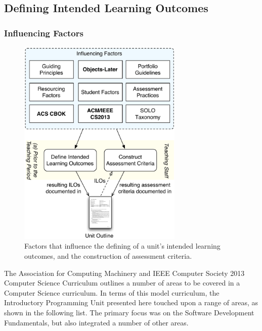 \subsection{Defining Intended Learning Outcomes} %
\label{sec:intro:intended_learning_outcomes}

\subsubsection{Influencing Factors} %
\label{ssub:influencing_factors}

\begin{figure}[htbp]
	\centering
	\includegraphics[width=0.7\textwidth]{ILOFactors}
	\caption{Factors that influence the defining of a unit's intended learning outcomes, and the construction of assessment criteria. }
	\label{fig:defining_ilos_intro}
\end{figure}

The Association for Computing Machinery and IEEE Computer Society 2013 Computer Science Curriculum \cite{CSC2013} outlines a number of areas to be covered in a Computer Science curriculum. In terms of this model curriculum, the Introductory Programming Unit presented here touched upon a range of areas, as shown in the following list. The primary focus was on the Software Development Fundamentals, but also integrated a number of other areas.

